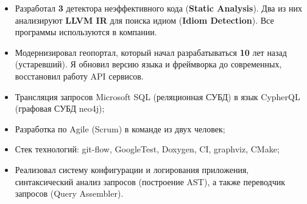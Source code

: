 \documentclass[10pt,a4paper,ragged2e,withhyper]{custom-altacv}
\begin{document}
\begin{paracol}{2}



\begin{itemize}
	\item Разработал \textbf{3} детектора неэффективного кода (\textbf{Static Analysis}). Два из них анализируют \textbf{LLVM IR} для поиска идиом (\textbf{Idiom Detection}). Все программы используются в компании.
\end{itemize}

\divider


\begin{itemize}
	\item Модернизировал геопортал, который начал разрабатываться \textbf{10} лет назад (устаревший). Я обновил версию языка и фреймворка до современных, восстановил работу API сервисов.
\end{itemize}





\begin{itemize}
	\item Трансляция запросов Microsoft SQL (реляционная СУБД) в язык CypherQL (графовая СУБД neo4j);
	\item Разработка по Agile (Scrum) в команде из двух человек;
	\item Стек технологий: git-flow, GoogleTest, Doxygen, CI, graphviz, CMake;
	\item Реализовал систему конфигурации и логирования приложения, синтаксический анализ запросов (построение AST), а также переводчик запросов (Query Assembler).
\end{itemize}

\divider



\end{paracol}
\end{document}

